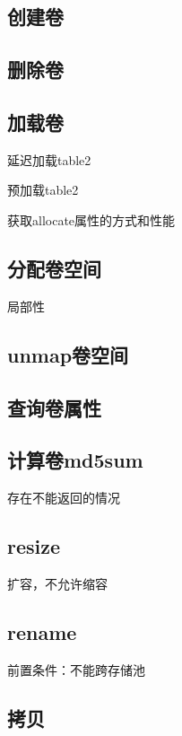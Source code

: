 \subsection{创建卷}

\subsection{删除卷}

\subsection{加载卷}

\begin{compactenum}
\item 延迟加载table2
\item 预加载table2
\item 获取allocate属性的方式和性能
\end{compactenum}

\subsection{分配卷空间}

局部性

\subsection{unmap卷空间}

\subsection{查询卷属性}

\subsection{计算卷md5sum}

存在不能返回的情况

\subsection{resize}

扩容，不允许缩容

\subsection{rename}

前置条件：不能跨存储池

\subsection{拷贝}

